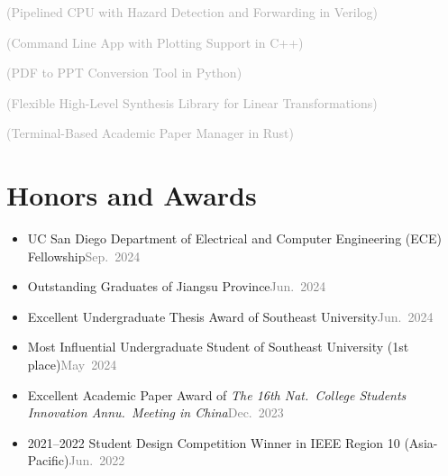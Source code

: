 \documentclass{color-cv}
\begin{document}
\begin{enumerate}[label = \textcolor{\ThemeColor}{\textbf{\arabic*}.}, ref=\textcolor{\ThemeColor}{[P\arabic*]}]
  \item \label{P:arm_lite}%
     \textcolor{darkgray}{(Pipelined CPU with Hazard Detection and Forwarding in Verilog)}
  \item \label{P:water_filling}%
     \textcolor{darkgray}{(Command Line App with Plotting Support in C++)}
  \item \label{P:pdf2ppt}%
     \textcolor{darkgray}{(PDF to PPT Conversion Tool in Python)}
  \item \label{P:flames}%
     \textcolor{darkgray}{(Flexible High-Level Synthesis Library for Linear Transformations)}
  \item \label{P:termipaper}%
     \textcolor{darkgray}{(Terminal-Based Academic Paper Manager in Rust)}
\end{enumerate}

\section{Honors and Awards}
\begin{itemize}
  \item UC San Diego Department of Electrical and Computer Engineering (ECE) Fellowship\hfill\textcolor{gray}{Sep.~2024}
  \item Outstanding Graduates of Jiangsu Province\hfill\textcolor{gray}{Jun.~2024}
  \item Excellent Undergraduate Thesis Award of Southeast University\hfill\textcolor{gray}{Jun.~2024}
  \item Most Influential Undergraduate Student of Southeast University (1st place)\hfill\textcolor{gray}{May~2024}
  \item Excellent Academic Paper Award of \textit{The 16th Nat.\ College Students Innovation Annu.\ Meeting in China}\hfill\textcolor{gray}{Dec.~2023} %
  \item 2021--2022 Student Design Competition Winner in IEEE Region 10 (Asia-Pacific)\hfill\textcolor{gray}{Jun.~2022}
\end{itemize}
\end{document}

